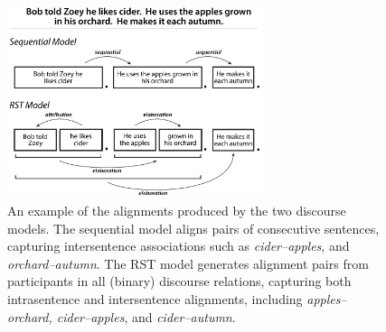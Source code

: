 %
%
%
%
%


\begin{figure}[t!]
\begin{center}
\includegraphics[width=75mm]{mainmatter/naacl2015-alignment/rst2a.pdf}
\caption{{\small An example of the alignments produced by the two discourse models.  The sequential model aligns pairs of consecutive sentences, capturing intersentence associations such as \emph{cider--apples}, and \emph{orchard--autumn}.  The RST model generates alignment pairs from participants in all (binary) discourse relations, capturing both intrasentence and intersentence alignments, including 
\emph{apples--orchard, cider--apples}, and \emph{cider--autumn}.}}
\label{fig:examples}
\end{center}
\end{figure}

